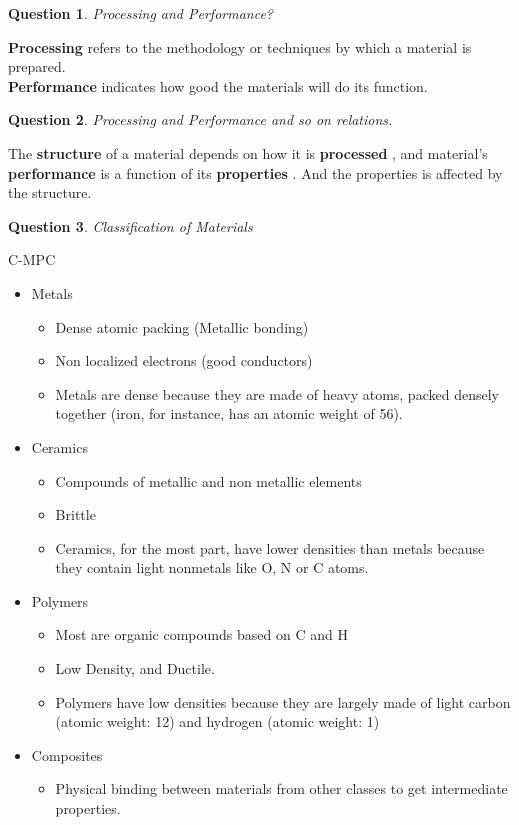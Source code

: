 \documentclass[13]{article}
\newtheorem{exer}{Question}
\begin{document}
\begin{exer}
Processing and Performance?
\end{exer}
\textbf{Processing} refers to the methodology or techniques by which a material is prepared. \\
\textbf{Performance} indicates how good the materials will do its function.
\begin{exer}
Processing and Performance and so on relations.
\end{exer}
The \textbf{structure}  of a material depends on how it is \textbf{processed} , and material's \textbf{performance} is a function of its \textbf{properties} . And the properties is affected by the structure. 
\begin{exer}
Classification of Materials
\end{exer}
C-MPC
\begin{itemize}

\item Metals
\begin{itemize}

	\item Dense atomic packing (Metallic bonding)
	\item Non localized electrons (good conductors)
	\item Metals are dense because they are made of heavy atoms, packed 
densely together (iron, for instance, has an atomic weight of 56).
\end{itemize}
\item Ceramics
\begin{itemize}

\item Compounds of metallic and non metallic elements
\item Brittle
\item Ceramics, for the most part, have lower densities than metals because
	they contain light nonmetals like O, N or C atoms.
\end{itemize}
\item Polymers
	\begin{itemize}
	
	\item Most are organic compounds based on C and H
	\item Low Density, and Ductile.
	\item Polymers have low densities because they are largely made of
		light carbon (atomic weight: 12) and hydrogen (atomic weight:
		1) 	
	\end{itemize}
\item Composites
\begin{itemize}

\item Physical binding between materials from other classes to get intermediate properties.

\end{itemize}
\end{itemize}
\end{document}
